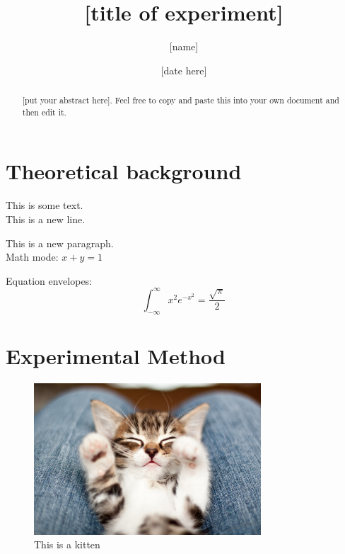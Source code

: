 \documentclass{article}
\title{[title of experiment]}
\author{[name]}
\date{[date here]}
\begin{document}
\maketitle %

\begin{abstract}
    [put your abstract here]\cite{nameofreference}. Feel free to copy and paste this into your own document and then edit it.
\end{abstract}

\section{Theoretical background}
This is some text.\\ %
This is a new line.

This is a new paragraph.\\ %
Math mode: $x+y=1$ %

Equation envelopes:
\begin{equation}
    \int_{-\infty}^{\infty}x^2e^{-x^2}=\frac{\sqrt{\pi}}{2} %
\end{equation}

\section{Experimental Method}
\begin{figure}[h]%
    \centering
    \includegraphics[width=85mm]{kitten.jpg}
    \caption{This is a kitten}
    \label{fig:kitten}
\end{figure}
\end{document}
